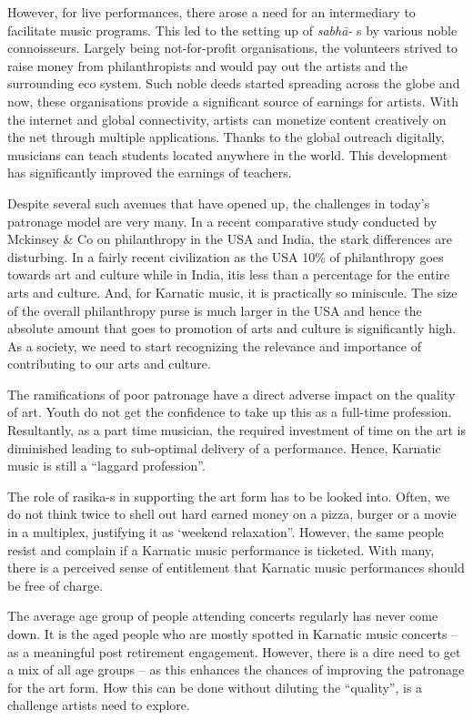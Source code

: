 However, for live performances, there arose a need for an intermediary to facilitate music programs. This led to the setting up of \textit{sabhā-} s by various noble connoisseurs. Largely being not-for-profit organisations, the volunteers strived to raise money from philanthropists and would pay out the artists and the surrounding eco system. Such noble deeds started spreading across the globe and now, these organisations provide a significant source of earnings for artists. With the internet and global connectivity, artists can monetize content creatively on the net through multiple applications. Thanks to the global outreach digitally, musicians can teach students located anywhere in the world. This development has significantly improved the earnings of teachers.

Despite several such avenues that have opened up, the challenges in today’s patronage model are very many. In a recent comparative study conducted by Mckinsey \& Co on philanthropy in the USA and India, the stark differences are disturbing. In a fairly recent civilization as the USA 10\% of philanthropy goes towards art and culture while in India, itis less than a percentage for the entire arts and culture. And, for Karnatic music, it is practically so miniscule. The size of the overall philanthropy purse is much larger in the USA and hence the absolute amount that goes to promotion of arts and culture is significantly high. As a society, we need to start recognizing the relevance and importance of contributing to our arts and culture.

The ramifications of poor patronage have a direct adverse impact on the quality of art. Youth do not get the confidence to take up this as a full-time profession. Resultantly, as a part time musician, the required investment of time on the art is diminished leading to sub-optimal delivery of a performance. Hence, Karnatic music is still a “laggard profession”.

The role of rasika-s in supporting the art form has to be looked into. Often, we do not think twice to shell out hard earned money on a pizza, burger or a movie in a multiplex, justifying it as ‘weekend relaxation”. However, the same people resist and complain if a Karnatic music performance is ticketed. With many, there is a perceived sense of entitlement that Karnatic music performances should be free of charge.

The average age group of people attending concerts regularly has never come down. It is the aged people who are mostly spotted in Karnatic music concerts – as a meaningful post retirement engagement. However, there is a dire need to get a mix of all age groups – as this enhances the chances of improving the patronage for the art form. How this can be done without diluting the “quality”, is a challenge artists need to explore.

